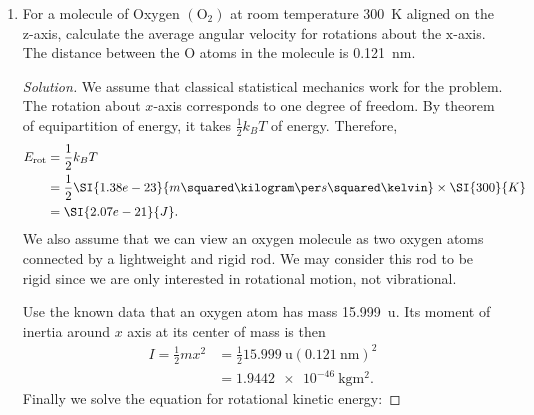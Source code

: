 \begin{enumerate}
\begin{proof}[Solution]
	We assume that the distribution is continuous and unimodal. It suffices to find an extremum value for $N(E)$.
 From calculus we know that a continous function reaches extremum iff its first derivative is zero at that point.\begin{align*}
	N'(E)&= 0 \\
	\frac{\partial }{\partial E} \left( \frac{2 N}{\sqrt{\pi}} \frac{1}{(k T)^{3 / 2}} E^{1 / 2} e^{-E / k T} \right) &= 0 \\
	\frac{\partial }{\partial E} \left( E^{1 / 2} e^{-E / k T} \right) &= 0 \\
	\frac{1}{2}E^{-\frac{1}{2}}e^{-\frac{E}{kT}} + E^{\frac{1}{2}}\left( -\frac{1}{KT} \right) e^{-\frac{E}{kT}} &= 0 \\
	\frac{1}{2}E^{-\frac{1}{2}} + E^{\frac{1}{2}}\left( -\frac{1}{KT} \right)  &= 0 \\
	\frac{1}{2} + E\left( -\frac{1}{KT} \right)  &= 0 \\
	E &= \frac{\frac{1}{2}}{\frac{1}{kT}} \\
	E &= \frac{1}{2}kT 
.\end{align*}
\end{proof}


\item For a molecule of Oxygen $\left(\mathrm{O}_{2}\right)$ at room temperature \SI{300}{\kelvin} aligned on the z-axis, calculate the average angular velocity for rotations about the $\mathrm{x}$-axis. The distance between the O atoms in the molecule is \SI{0.121}{\nano\metre}.
\begin{proof}[Solution]
	We assume that classical statistical mechanics work for the problem. The rotation about $x$-axis corresponds to one degree of freedom. By theorem of equipartition of energy, it takes $\frac{1}{2}k_B T$ of energy. Therefore,
\begin{align*}
	E_{\text{rot}}&= \frac{1}{2}k_B T \\
	&= \frac{1}{2} \SI{1.38e-23}{m\squared \kilogram \per s \squared \kelvin} \times  \SI{300}{K} \\
	&=  \SI{2.07e-21}{J}
.\end{align*}
We also assume that we can view an oxygen molecule as two oxygen atoms connected by a lightweight and rigid rod. We may consider this rod to be rigid since we are only interested in rotational motion, not vibrational.

Use the known data that an oxygen atom has mass  \SI{15.999}{\atomicmassunit}. Its moment of inertia around $x$ axis at its center of mass is then
\begin{align}
	I = \frac{1}{2} m x^2 &= \frac{1}{2} \SI{15.999}{\atomicmassunit} (\SI{0.121}{\nano\metre})^2 \\
&=  \SI{1.9442e-46}{\kilogram \square \metre}
.\end{align}
Finally we solve the equation for rotational kinetic energy:


\end{proof}
\end{enumerate}
